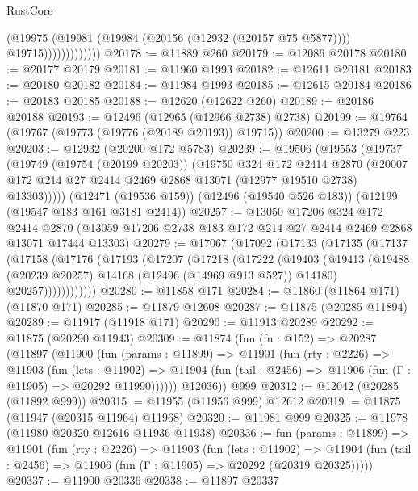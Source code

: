 \begin{lexlean}{RustCore}
\begin{coremodule}
                          (@19975
                            (@19981
                              (@19984 (@20156 (@12932 (@20157 @75 @5877))))
                              @19715)))))))))))))
@20178 := @11889 @260
@20179 := @12086 @20178
@20180 := @20177 @20179
@20181 := @11960 @1993
@20182 := @12611 @20181
@20183 := @20180 @20182
@20184 := @11984 @1993
@20185 := @12615 @20184
@20186 := @20183 @20185
@20188 := @12620 (@12622 @260)
@20189 := @20186 @20188
@20193 := @12496 (@12965 (@12966 @2738) @2738)
@20199 := @19764 (@19767 (@19773 (@19776 (@20189 @20193)) @19715))
@20200 := @13279 @223
@20203 := @12932 (@20200 @172 @5783)
@20239 := @19506
    (@19553
      (@19737
        (@19749
          (@19754 (@20199 @20203))
          (@19750
            @324
            @172
            @2414
            @2870
            (@20007 @172 @214 @27 @2414 @2469 @2868 @13071 (@12977 @19510 @2738) @13303)))))
    (@12471 (@19536 @159))
    (@12496 (@19540 @526 @183))
    (@12199 (@19547 @183 @161 @3181 @2414))
@20257 := @13050
    @17206
    @324
    @172
    @2414
    @2870
    (@13059 @17206 @2738 @183 @172 @214 @27 @2414 @2469 @2868 @13071 @17444 @13303)
@20279 := @17067
    (@17092
      (@17133
        (@17135
          (@17137
            (@17158
              (@17176
                (@17193
                  (@17207
                    (@17218
                      (@17222
                        (@19403
                          (@19413
                            (@19488 (@20239 @20257) @14168 (@12496 (@14969 @913 @527)) @14180)
                            @20257))))))))))))
@20280 := @11858 @171
@20284 := @11860 (@11864 @171) (@11870 @171)
@20285 := @11879 @12608
@20287 := @11875 (@20285 @11894)
@20289 := @11917 (@11918 @171)
@20290 := @11913 @20289
@20292 := @11875 (@20290 @11943)
@20309 := @11874
    (fun (fn : @152) =>
    @20287
      (@11897
        (@11900
          (fun (params : @11899) =>
          @11901
            (fun (rty : @2226) =>
            @11903
              (fun (lets : @11902) =>
              @11904 (fun (tail : @2456) => @11906 (fun (Γ : @11905) => @20292 @11990))))))
        @12036))
    @999
@20312 := @12042 (@20285 (@11892 @999))
@20315 := @11955 (@11956 @999) @12612
@20319 := @11875 (@11947 (@20315 @11964) @11968)
@20320 := @11981 @999
@20325 := @11978 (@11980 @20320 @12616 @11936 @11938)
@20336 := fun (params : @11899) =>
  @11901
    (fun (rty : @2226) =>
    @11903
      (fun (lets : @11902) =>
      @11904 (fun (tail : @2456) => @11906 (fun (Γ : @11905) => @20292 (@20319 @20325)))))
@20337 := @11900 @20336
@20338 := @11897 @20337

\end{coremodule}
\end{lexlean}
